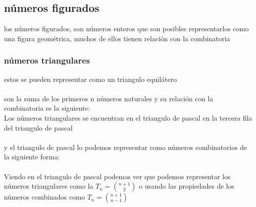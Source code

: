 \subsection{números figurados}
los números figurados, son números enteros  que son posibles representarlos como una figura geométrica, muchos de ellos tienen relación con la combinatoria
\subsubsection{números triangulares}
estos se pueden representar como un triangulo equilátero
\\
\\son la suma de los primeros n números naturales y su relación con la combinatoria es la siguiente:
\\Los números triangulares se encuentran en el triangulo de pascal en la tercera fila del triangulo de pascal
\\
\\y el triangulo de pascal lo podemos representar como números combinatorios de la siguiente forma:
\\
\\Viendo en el triangulo de pascal podemos ver que podemos representar los números triangulares como la  $T_{n}=\binom{n+1}{2} $ o usando las propiedades de los números combinados como   $T_{n}=\binom{n+1}{n-1}$
